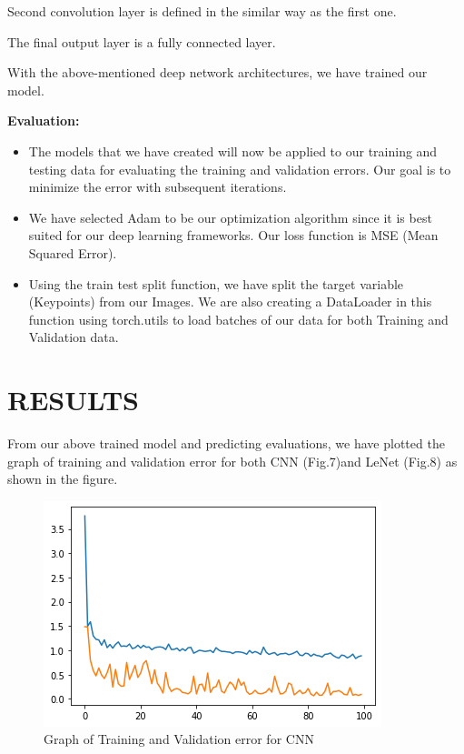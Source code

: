 \documentclass[conference]{IEEEtran}
\begin{document}
Second convolution layer is defined in the similar way as the first one.

The final output layer is a fully connected layer.

With the above-mentioned deep network architectures, we have trained our model. 




\textbf{Evaluation:}

\begin{itemize}
    \item The models that we have created will now be applied to our training and testing data for evaluating the training and validation errors. Our goal is to minimize the error with subsequent iterations. 
    
    \item We have selected Adam to be our optimization algorithm since it is best suited for our deep learning frameworks. Our loss function is MSE (Mean Squared Error).
    
    \item Using the train test split function, we have split the target variable (Keypoints) from our Images. We are also creating a DataLoader in this function using torch.utils to load batches of our data for both Training and Validation data.
\end{itemize}

\section{RESULTS}

From our above trained model and predicting evaluations, we have plotted the graph of training and validation error for both CNN (Fig.7)and LeNet (Fig.8) as shown in the figure. 

\begin{figure}[h!]
    \centering
    \includegraphics[scale=0.6]{cnn.png}
    \caption{Graph of Training and Validation error for CNN}
    \label{fig:my_label}
\end{figure}
\end{document}
